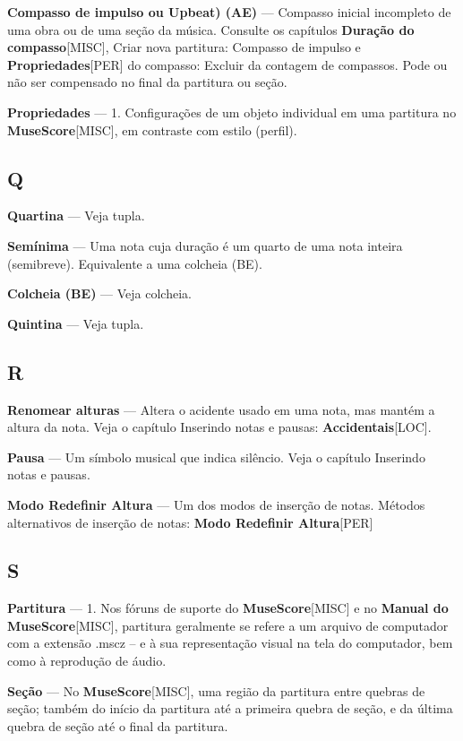 \documentclass[a4paper,12pt]{article}
\begin{document}
\textbf{Compasso de impulso  ou Upbeat) (AE)} --- Compasso inicial incompleto de uma obra ou de uma seção da música. Consulte os capítulos \textbf{Duração do compasso}\textsc{[MISC]}, Criar nova partitura: Compasso de impulso e \textbf{Propriedades}\textsc{[PER]} do compasso: Excluir da contagem de compassos. Pode ou não ser compensado no final da partitura ou seção.

\textbf{Propriedades} --- 1. Configurações de um objeto individual em uma partitura no \textbf{MuseScore}\textsc{[MISC]}, em contraste com estilo (perfil).

\subsection*{Q}
\textbf{Quartina} --- Veja tupla.

\textbf{Semínima} --- Uma nota cuja duração é um quarto de uma nota inteira (semibreve). Equivalente a uma colcheia (BE).

\textbf{Colcheia (BE)} --- Veja colcheia.

\textbf{Quintina} --- Veja tupla.

\subsection*{R}
\textbf{Renomear alturas} --- Altera o acidente usado em uma nota, mas mantém a altura da nota. Veja o capítulo Inserindo notas e pausas: \textbf{Accidentais}\textsc{[LOC]}.

\textbf{Pausa} --- Um símbolo musical que indica silêncio. Veja o capítulo Inserindo notas e pausas.

\textbf{Modo Redefinir Altura} --- Um dos modos de inserção de notas. Métodos alternativos de inserção de notas: \textbf{Modo Redefinir Altura}\textsc{[PER]}

\subsection*{S}
\textbf{Partitura} --- 1. Nos fóruns de suporte do \textbf{MuseScore}\textsc{[MISC]} e no \textbf{Manual do MuseScore}\textsc{[MISC]}, partitura geralmente se refere a um arquivo de computador com a extensão .mscz -- e à sua representação visual na tela do computador, bem como à reprodução de áudio.

\textbf{Seção} --- No \textbf{MuseScore}\textsc{[MISC]}, uma região da partitura entre quebras de seção; também do início da partitura até a primeira quebra de seção, e da última quebra de seção até o final da partitura.
\end{document}
